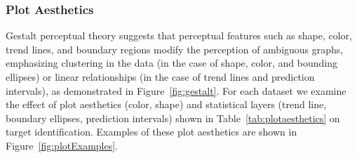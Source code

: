 \documentclass[12pt]{article}\usepackage[]{graphicx}\usepackage[]{color}
\begin{document}
\subsubsection{Plot Aesthetics}
Gestalt perceptual theory suggests that perceptual features such as shape, color, trend lines, and boundary regions modify the perception of ambiguous graphs, emphasizing clustering in the data (in the case of shape, color, and bounding ellipses) or linear relationships (in the case of trend lines and prediction intervals), as demonstrated in Figure~\ref{fig:gestalt}. For each dataset we examine the effect of plot aesthetics (color, shape) and statistical layers (trend line, boundary ellipses, prediction intervals) shown in Table~\ref{tab:plotaesthetics}  on target identification. Examples of these plot aesthetics are shown in Figure~\ref{fig:plotExamples}.
\begin{table}[hbtp]
\centering
{}
\end{table}
\end{document}
